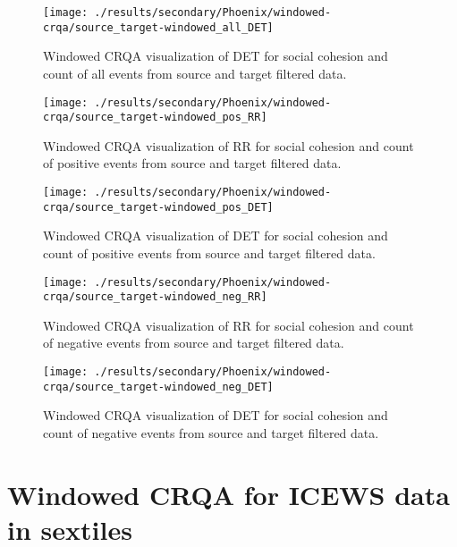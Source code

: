 \documentclass[english,man]{apa6}
\begin{document}
\begin{appendix}
\begin{figure}[H]
\end{figure}
\begin{figure}[H]
\texttt{[image: ./results/secondary/Phoenix/windowed-crqa/source\_target-windowed\_all\_DET]} \caption{Windowed CRQA visualization of DET for social cohesion and count of all events from source and target filtered data.}\label{fig:plot-DET-source-targ-all-secondary-Phoenix}
\end{figure}
\begin{figure}[H]
\texttt{[image: ./results/secondary/Phoenix/windowed-crqa/source\_target-windowed\_pos\_RR]} \caption{Windowed CRQA visualization of RR for social cohesion and count of positive events from source and target filtered data.}\label{fig:plot-RR-source-targ-pos-secondary-Phoenix}
\end{figure}
\begin{figure}[H]
\texttt{[image: ./results/secondary/Phoenix/windowed-crqa/source\_target-windowed\_pos\_DET]} \caption{Windowed CRQA visualization of DET for social cohesion and count of positive events from source and target filtered data.}\label{fig:plot-DET-source-targ-pos-secondary-Phoenix}
\end{figure}
\begin{figure}[H]
\texttt{[image: ./results/secondary/Phoenix/windowed-crqa/source\_target-windowed\_neg\_RR]} \caption{Windowed CRQA visualization of RR for social cohesion and count of negative events from source and target filtered data.}\label{fig:plot-RR-source-targ-neg-secondary-Phoenix}
\end{figure}
\begin{figure}[H]
\texttt{[image: ./results/secondary/Phoenix/windowed-crqa/source\_target-windowed\_neg\_DET]} \caption{Windowed CRQA visualization of DET for social cohesion and count of negative events from source and target filtered data.}\label{fig:plot-DET-source-targ-neg-secondary-Phoenix}
\end{figure}

\hypertarget{windowed-crqa-for-icews-data-in-sextiles}{%
\section{Windowed CRQA for ICEWS data in
sextiles}\label{windowed-crqa-for-icews-data-in-sextiles}}


\end{appendix}
\end{document}
